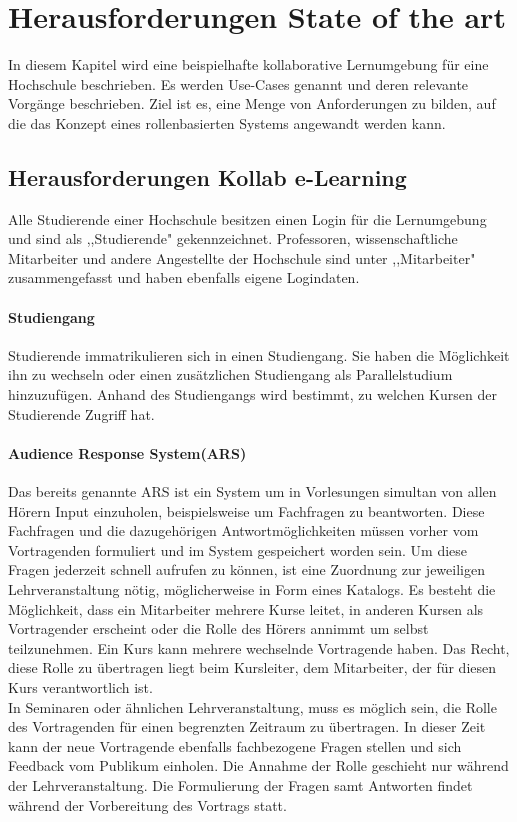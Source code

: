 \documentclass[conference]{IEEEtran}
\begin{document}
\section{Herausforderungen State of the art}
In diesem Kapitel wird eine beispielhafte kollaborative Lernumgebung für eine Hochschule beschrieben. Es werden Use-Cases genannt und deren relevante Vorgänge beschrieben. %
Ziel ist es, eine Menge von Anforderungen zu bilden, auf die das Konzept eines rollenbasierten Systems angewandt werden kann. 

\subsection{Herausforderungen Kollab e-Learning} 
Alle Studierende einer Hochschule besitzen einen Login für die Lernumgebung und sind als ,,Studierende" gekennzeichnet. Professoren, wissenschaftliche Mitarbeiter und andere Angestellte der Hochschule sind unter ,,Mitarbeiter" zusammengefasst und haben ebenfalls eigene Logindaten. \paragraph{Studiengang} Studierende immatrikulieren sich in einen Studiengang. Sie haben die Möglichkeit ihn zu wechseln oder  einen zusätzlichen Studiengang als Parallelstudium hinzuzufügen. Anhand des Studiengangs wird bestimmt, zu welchen Kursen der Studierende Zugriff hat. \paragraph{Audience Response System(ARS)} Das bereits genannte ARS ist ein System um in Vorlesungen simultan von allen Hörern Input einzuholen, beispielsweise um Fachfragen zu beantworten. Diese Fachfragen und die dazugehörigen Antwortmöglichkeiten müssen vorher vom Vortragenden formuliert und im System gespeichert worden sein. Um diese Fragen jederzeit schnell aufrufen zu können, ist eine Zuordnung zur jeweiligen Lehrveranstaltung nötig, möglicherweise in Form eines Katalogs. Es besteht die Möglichkeit, dass ein Mitarbeiter mehrere Kurse leitet, in anderen Kursen als Vortragender erscheint oder die Rolle des Hörers annimmt um selbst teilzunehmen. Ein Kurs kann mehrere wechselnde Vortragende haben. Das Recht, diese Rolle zu übertragen liegt beim Kursleiter, dem Mitarbeiter, der für diesen Kurs verantwortlich ist.\\ In Seminaren oder ähnlichen Lehrveranstaltung, muss es möglich sein, die Rolle des Vortragenden für einen begrenzten Zeitraum zu übertragen. In dieser Zeit kann der neue Vortragende ebenfalls fachbezogene Fragen stellen und sich Feedback vom Publikum einholen. Die Annahme der Rolle geschieht nur während der Lehrveranstaltung. Die Formulierung der Fragen samt Antworten findet während der Vorbereitung des Vortrags statt. 
\end{document}
